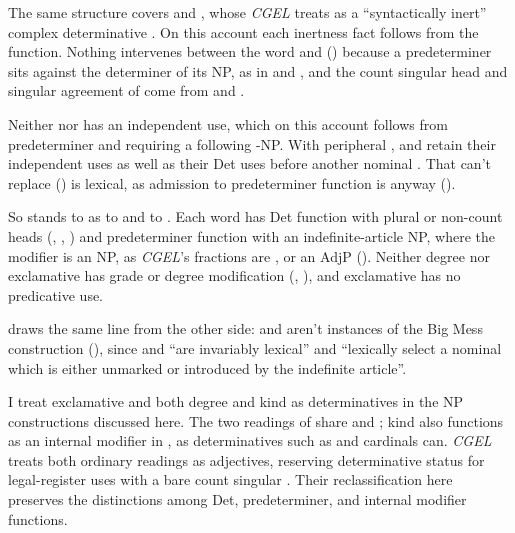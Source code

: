 \documentclass[12pt]{article}
\begin{document}
The same structure covers  and , whose  \textit{CGEL} treats as a \enquote{syntactically inert} complex determinative \citep[394]{huddleston2002}. On this account each inertness fact follows from the function. Nothing intervenes between the word and  () because a predeterminer sits against the determiner of its NP, as in  and , and the count singular head and singular agreement of  come from  and .

Neither  nor  has an independent use, which on this account follows from predeterminer  and  requiring a following -NP. With peripheral ,  and  retain their independent uses as well as their Det uses before another nominal \citep[392, 394]{huddleston2002}. That  can't replace  () is lexical, as admission to predeterminer function is anyway ().

So  stands to  as  to  and  to . Each word has Det function with plural or non-count heads (, , ) and predeterminer function with an indefinite-article NP, where the modifier is an NP, as \textit{CGEL}'s fractions are \citep[385 n.~25]{huddleston2002}, or an AdjP (). Neither degree  nor exclamative  has grade or degree modification (, ), and exclamative  has no predicative use.

\textcite[§5]{VanEynde_2007_BigMess} draws the same line from the other side:  and  aren't instances of the Big Mess construction (), since  and  \enquote{are invariably lexical} and \enquote{lexically select a nominal which is either unmarked or introduced by the indefinite article}.

I treat exclamative  and both degree and kind  as determinatives in the NP constructions discussed here. The two readings of  share  and ; kind  also functions as an internal modifier in , as determinatives such as  and cardinals can. \textit{CGEL} treats both ordinary readings as adjectives, reserving determinative status for legal-register uses with a bare count singular \citep[435 and n.~52]{huddleston2002}. Their reclassification here preserves the distinctions among Det, predeterminer, and internal modifier functions.
\end{document}
